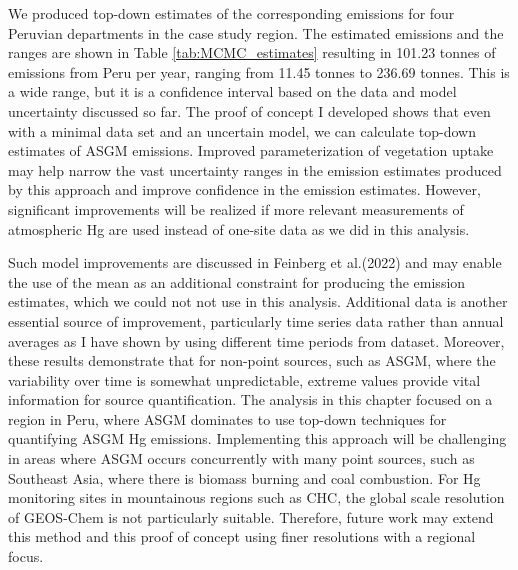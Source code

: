 \begin{flushleft}
  We produced top-down estimates of the corresponding emissions for four Peruvian departments in the case study region. The estimated emissions and the ranges are shown in Table \ref{tab:MCMC_estimates} resulting in 101.23 tonnes of emissions from Peru per year, ranging from 11.45 tonnes to 236.69 tonnes. This is a wide range, but it is a confidence interval based on the data and model uncertainty discussed so far. The proof of concept I developed shows that even with a minimal data set and an uncertain model, we can calculate top-down estimates of ASGM \hg emissions. Improved parameterization of vegetation uptake may help narrow the vast uncertainty ranges in the emission estimates produced by this approach and improve confidence in the \hg emission estimates. However, significant improvements will be realized if more relevant measurements of atmospheric Hg are used instead of one-site data as we did in this analysis.  
  \end{flushleft}
  
  \begin{flushleft}
  Such model improvements are discussed in Feinberg et al.(2022)\cite{feinberg_evaluating_2022} and may enable the use of the mean as an additional constraint for producing the \hg emission estimates, which we could not not use in this analysis. Additional data is another essential source of improvement, particularly time series data rather than annual averages as I have shown by using different time periods from \obsC dataset. Moreover, these results demonstrate that for non-point sources, such as ASGM, where the variability over time is somewhat unpredictable, extreme values provide vital information for source quantification. The analysis in this chapter focused on a region in Peru, where ASGM dominates to use top-down techniques for quantifying ASGM Hg emissions. Implementing this approach will be challenging in areas where ASGM occurs concurrently with many point sources, such as Southeast Asia, where there is biomass burning and coal combustion. For Hg monitoring sites in mountainous regions such as CHC, the global scale resolution of GEOS-Chem is not particularly suitable. Therefore, future work may extend this method and this proof of concept using finer resolutions with a regional focus.
   \end{flushleft}
  
